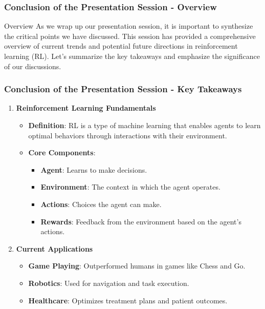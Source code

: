 \documentclass[aspectratio=169]{beamer}
\begin{document}
\begin{frame}[fragile]
    \frametitle{Conclusion of the Presentation Session - Overview}
    \begin{block}{Overview}
        As we wrap up our presentation session, it is important to synthesize the critical points we have discussed. 
        This session has provided a comprehensive overview of current trends and potential future directions in reinforcement learning (RL). 
        Let’s summarize the key takeaways and emphasize the significance of our discussions.
    \end{block}
\end{frame}

\begin{frame}[fragile]
    \frametitle{Conclusion of the Presentation Session - Key Takeaways}
    \begin{enumerate}
        \item \textbf{Reinforcement Learning Fundamentals}
        \begin{itemize}
            \item \textbf{Definition}: RL is a type of machine learning that enables agents to learn optimal behaviors through interactions with their environment.
            \item \textbf{Core Components}: 
            \begin{itemize}
                \item \textbf{Agent}: Learns to make decisions.
                \item \textbf{Environment}: The context in which the agent operates.
                \item \textbf{Actions}: Choices the agent can make.
                \item \textbf{Rewards}: Feedback from the environment based on the agent's actions.
            \end{itemize}
        \end{itemize}

        \item \textbf{Current Applications}
        \begin{itemize}
            \item \textbf{Game Playing}: Outperformed humans in games like Chess and Go.
            \item \textbf{Robotics}: Used for navigation and task execution.
            \item \textbf{Healthcare}: Optimizes treatment plans and patient outcomes.
        \end{itemize}
    \end{enumerate}
\end{frame}
\end{document}
